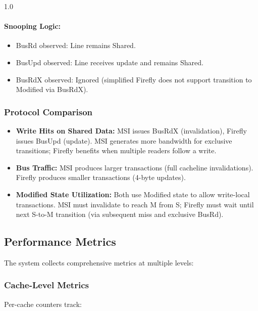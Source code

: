 \documentclass[12pt]{article}
\begin{document}
\begin{spacing}{1.0}
\paragraph{Snooping Logic:}

\begin{itemize}
    \item BusRd observed: Line remains Shared.
    \item BusUpd observed: Line receives update and remains Shared.
    \item BusRdX observed: Ignored (simplified Firefly does not support transition to Modified via BusRdX).
\end{itemize}

\subsubsection{Protocol Comparison}

\begin{itemize}
    \item \textbf{Write Hits on Shared Data:} MSI issues BusRdX (invalidation), Firefly issues BusUpd (update). MSI generates more bandwidth for exclusive transitions; Firefly benefits when multiple readers follow a write.
    
    \item \textbf{Bus Traffic:} MSI produces larger transactions (full cacheline invalidations). Firefly produces smaller transactions (4-byte updates).
    
    \item \textbf{Modified State Utilization:} Both use Modified state to allow write-local transactions. MSI must invalidate to reach M from S; Firefly must wait until next S-to-M transition (via subsequent miss and exclusive BusRd).
\end{itemize}

\subsection{Performance Metrics}

The system collects comprehensive metrics at multiple levels:

\subsubsection{Cache-Level Metrics}

Per-cache counters track:


\end{spacing}
\end{document}
